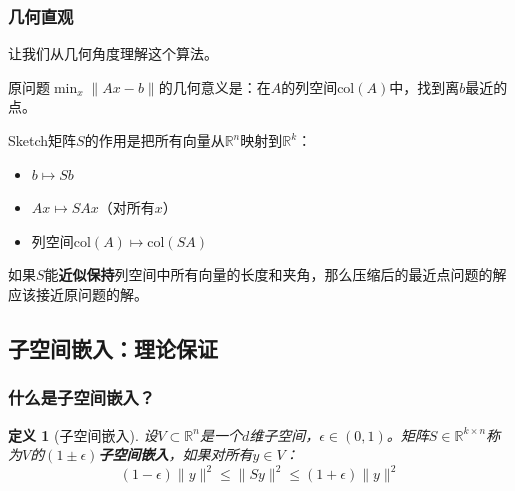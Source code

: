 \documentclass[11pt,a4paper]{ctexart}
\newtheorem{definition}[theorem]{定义}
\theoremstyle{definition}
\theoremstyle{remark}
\begin{document}
\subsubsection{几何直观}

让我们从几何角度理解这个算法。

原问题$\min_x \|Ax - b\|$的几何意义是：在$A$的列空间$\text{col}(A)$中，找到离$b$最近的点。

\begin{center}
\end{center}

Sketch矩阵$S$的作用是把所有向量从$\mathbb{R}^n$映射到$\mathbb{R}^k$：
\begin{itemize}
    \item $b \mapsto Sb$
    \item $Ax \mapsto SAx$（对所有$x$）
    \item 列空间$\text{col}(A) \mapsto \text{col}(SA)$
\end{itemize}

如果$S$能\textbf{近似保持}列空间中所有向量的长度和夹角，那么压缩后的最近点问题的解应该接近原问题的解。


\subsection{子空间嵌入：理论保证}

\subsubsection{什么是子空间嵌入？}

\begin{definition}[子空间嵌入]
设$V \subset \mathbb{R}^n$是一个$d$维子空间，$\epsilon \in (0, 1)$。矩阵$S \in \mathbb{R}^{k \times n}$称为$V$的$(1 \pm \epsilon)$\textbf{子空间嵌入}，如果对所有$y \in V$：
\[
(1 - \epsilon)\|y\|^2 \leq \|Sy\|^2 \leq (1 + \epsilon)\|y\|^2
\]
\end{definition}
\end{document}

